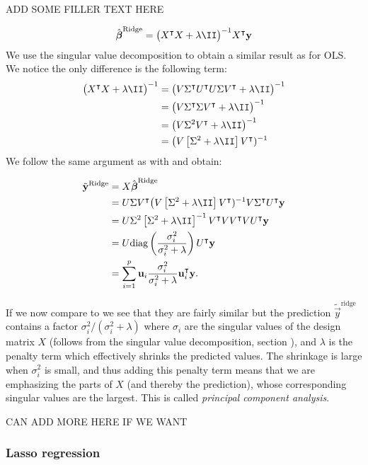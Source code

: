ADD SOME FILLER TEXT HERE

\begin{align*}
    \optbeta^\text{Ridge} = \big(\hessian + \lambda \II\big)^{-1} X\TT\vec{y}
\end{align*}
We use the singular value decomposition to obtain a similar result as for OLS. We notice the only difference is the following term:
\begin{align*}
    \big(\hessian + \lambda\II\big)^{-1} &= \big(V\ST\UT U\S\VT + \lambda\II\big)^{-1}\\
    &= \big(V\ST\S\VT + \lambda\II\big)^{-1} \\
    &=\big(V\S^2\VT + \lambda\II\big)^{-1} \\
    &= \big(V\left[\S^2+\lambda\II\right]\VT)^{-1}
\end{align*}
We follow the same argument as with  and obtain:

\begin{align}\label{eq:ridge_svd}
    \tilde{\vec{y}}^{\text{Ridge}} &=X\optbeta^{\text{Ridge}} \nonumber \\
    &= U\S\VT \big(V\left[\S^2+\lambda\II\right]\VT)^{-1} V\ST\UT\vec{y}\nonumber  \\
    &= U\S^2\left[\S^2+\lambda\II\right]^{-1} \VT V\VT V\UT\vec{y}\nonumber  \\
    &= U\text{diag}\left(\frac{\sigma_i^2}{\sigma_i^2+\lambda}\right)\UT\vec{y} \nonumber \\
    &= \sum_{i=1}^p\vec{u}_i\frac{\sigma_i^2}{\sigma_i^2+\lambda}\vec{u}\TT_i\vec{y}.
\end{align}

If we now compare  to  we see that they are fairly similar but the prediction $\tilde{\vec{y}}^{\text{ridge}}$ contains a factor $\sigma_i^2/(\sigma_i^2 + \lambda)$ where $\sigma_i$ are the singular values of the design matrix $X$ (follows from the singular value decomposition, section ), and $\lambda$ is the penalty term which effectively shrinks the predicted values. The shrinkage is large when $\sigma_i^2$ is small, and thus adding this penalty term means that we are emphasizing the parts of $X$ (and thereby the prediction), whose corresponding singular values are the largest. This is called \textit{principal component analysis}.

CAN ADD MORE HERE IF WE WANT


\subsubsection{Lasso regression}\label{sec:Lasso}

